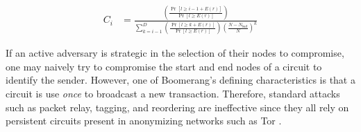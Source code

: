 \begin{align*}
C_i & = \frac{\left( \frac{ \Pr[l \geq i - 1 + E(r)] } { \Pr[l \geq E(r)] }\right)}{\sum_{k=i-1}^{D} \left( \frac{ \Pr[l \geq k + E(r)] } { \Pr[l \geq E(r)] }\right) \left(\frac{N - N_{bad}}{N}\right)^{k}}
\end{align*}


If an active adversary is strategic in the selection of their nodes to compromise, one may naively try to compromise the start and end nodes of a circuit to identify the sender. However, one of Boomerang's defining characteristics is that a circuit is use \emph{once} to broadcast a new transaction. Therefore, standard attacks such as packet relay, tagging, and reordering are ineffective since they all rely on persistent circuits present in anonymizing networks such as Tor \cite{tor}. 


